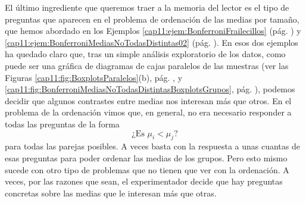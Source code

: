 El último ingrediente que queremos traer a la memoria del lector es el tipo de preguntas que aparecen en el problema de ordenación de las medias por tamaño, que hemos abordado en los Ejemplos  \ref{cap11:ejem:BonferroniFrailecillos} (pág. \pageref{cap11:ejem:BonferroniFrailecillos}) y \ref{cap11:ejem:BonferroniMediasNoTodasDistintas02} (pág. \pageref{cap11:ejem:BonferroniMediasNoTodasDistintas02}). En esos dos ejemplos ha quedado claro que, tras un simple análisis exploratorio de los datos, como puede ser una gráfica de diagramas de cajas paralelos de las muestras (ver las Figuras \ref{cap11:fig:BoxplotsParalelos}(b), pág. \pageref{cap11:fig:BoxplotsParalelos}, y \ref{cap11:fig:BonferroniMediasNoTodasDistintasBoxplotsGrupos}, pág. \pageref{cap11:fig:BonferroniMediasNoTodasDistintasBoxplotsGrupos}),  podemos decidir que algunos contrastes entre medias nos interesan más que otros. En el problema de la ordenación vimos que, en general, no era necesario responder a todas las preguntas de la forma
\[\mbox{¿Es $\mu_i<\mu_j$?}\]
para todas las parejas posibles. A veces basta con la respuesta a unas cuantas de esas preguntas para poder ordenar las medias de los grupos. Pero esto mismo sucede con otro tipo de problemas que no tienen que ver con la ordenación. A veces, por las razones que sean, el experimentador decide que hay preguntas concretas sobre las medias que le interesan más que otras.
